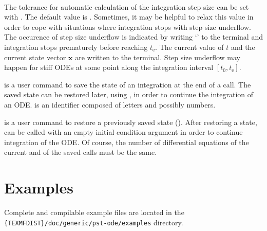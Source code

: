\documentclass[
  fontsize=11pt,
  english,
  BCOR=10mm,DIV=12,
  bibliography=totoc,
  parskip=false,
  headings=small,
  headinclude=false,
  footinclude=false,
  twoside=false,
  UKenglish
]{pst-doc}
\begin{document}
\noindent{}\\
The tolerance for automatic calculation of the integration step size can be set with . The default value is . Sometimes, it may be helpful to relax this value in order to cope with situations where integration stops with step size underflow. The occurence of step size underflow is indicated by writing `\Lkeyword{!}' to the terminal and integration stops prematurely before reaching $t_\mathrm{e}$. The current value of $t$ and the current state vector $\mathbf{x}$ are written to the terminal. Step size underflow may happen for stiff ODEs at some point along the integration interval $[t_0, t_\mathrm{e}]$.\\[1ex]

\begin{BDef}
\end{BDef}
is a user command to save the state of an integration at the end of a  call. The saved state can be restored later, using , in order to continue the integration of an ODE.  is an identifier composed of letters and possibly numbers.\\[1ex]

\begin{BDef}
\end{BDef}
is a user command to restore a previously saved state (). After restoring a state,  can be called with an empty initial condition argument in order to continue integration of the ODE. Of course, the number of differential equations of the current and of the saved  calls must be the same.

\section{Examples}
Complete and compilable example files are located in the \Verb+{TEXMFDIST}/doc/generic/pst-ode/examples+ directory.
\end{document}
